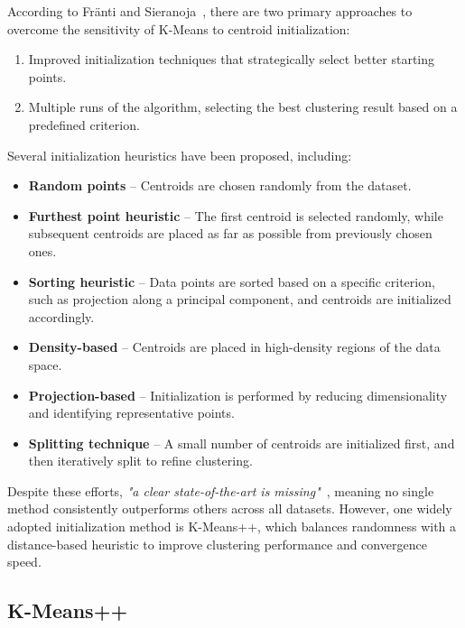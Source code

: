 \documentclass[10pt,twocolumn,letterpaper]{article}
\begin{document}
According to Fränti and Sieranoja~\cite{FRANTI201995}, there are two primary
approaches to overcome the sensitivity of K-Means to centroid initialization:
\begin{enumerate}
    \item Improved initialization techniques that strategically select better starting
          points.
    \item Multiple runs of the algorithm, selecting the best clustering result based on a
          predefined criterion.
\end{enumerate}
Several initialization heuristics have been proposed, including:
\begin{itemize}
    \item \textbf{Random points} – Centroids are chosen randomly from the dataset.
    \item \textbf{Furthest point heuristic} – The first centroid is selected randomly, while
          subsequent centroids are placed as far as possible from previously chosen ones.
    \item \textbf{Sorting heuristic} – Data points are sorted based on a specific criterion, such
          as projection along a principal component, and centroids are initialized
          accordingly.
    \item \textbf{Density-based} – Centroids are placed in high-density regions of the data space.
    \item \textbf{Projection-based} – Initialization is performed by reducing dimensionality and
          identifying representative points.
    \item \textbf{Splitting technique} – A small number of centroids are initialized first, and
          then iteratively split to refine clustering.
\end{itemize}
Despite these efforts, \textit{"a clear state-of-the-art is missing"}~\cite{FRANTI201995}, meaning no single method consistently outperforms others across all datasets. However, one widely adopted initialization method is K-Means++, which balances randomness with a distance-based heuristic to improve clustering performance and convergence speed.


\subsection{K-Means++}\label{subsec:k-means++}
\end{document}
